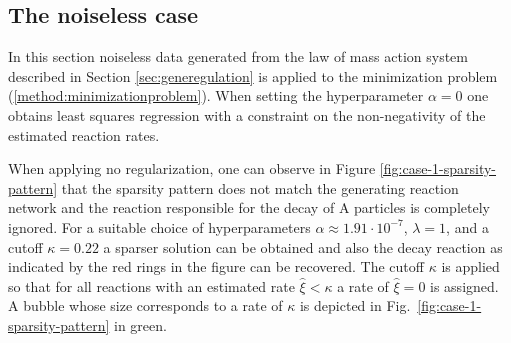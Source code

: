 \documentclass[oneside, abstracton, titlepage]{scrartcl}
\begin{document}
	\subsection{The noiseless case}\label{sec:case-1}
	
	In this section noiseless data generated from the law of mass action system described in Section \ref{sec:generegulation} is applied to the minimization problem (\ref{method:minimizationproblem}). When setting the hyperparameter $\alpha=0$ one obtains least squares regression with a constraint on the non-negativity of the estimated reaction rates.
	
	When applying no regularization, one can observe in Figure \ref{fig:case-1-sparsity-pattern} that the sparsity pattern does not match the generating reaction network and the reaction responsible for the decay of $\mathrm{A}$ particles is completely ignored. For a suitable choice of hyperparameters $\alpha \approx 1.91\cdot 10^{-7}$, $\lambda=1$, and a cutoff $\kappa = 0.22$ a sparser solution can be obtained and also the decay reaction as indicated by the red rings in the figure can be recovered. The cutoff $\kappa$ is applied so that for all reactions with an estimated rate $\hat{\xi} < \kappa$ a rate of $\hat{\xi} = 0$ is assigned. A bubble whose size corresponds to a rate of $\kappa$ is depicted in Fig.~\ref{fig:case-1-sparsity-pattern} in green.
	
\end{document}
